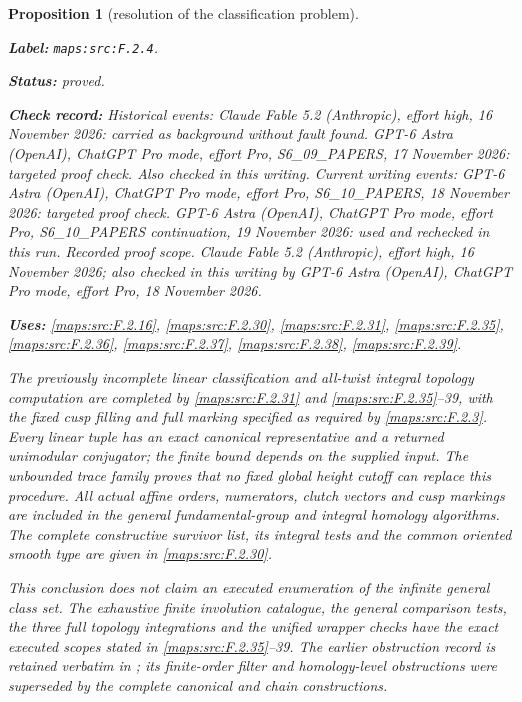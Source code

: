 \documentclass[11pt,a4paper]{article}
\newtheorem{proposition}[proposition]{Proposition}
\theoremstyle{definition}
\newcommand{\StatementRecord}[4]{\par\smallskip\begingroup\upshape\raggedright\noindent\textbf{Label:} \nolinkurl{#1}.\par\noindent\textbf{Status:} #2.\par\noindent\textbf{Check record:} #3.\par\noindent\textbf{Uses:} #4.\par\endgroup\smallskip}
\begin{document}
\begin{proposition}[resolution of the classification problem]\label{maps:src:F.2.4}
\StatementRecord{maps:src:F.2.4}{proved}{Historical events: Claude Fable 5.2 (Anthropic), effort high, 16 November 2026: carried as background without fault found. GPT-6 Astra (OpenAI), ChatGPT Pro mode, effort Pro, S6\_09\_PAPERS, 17 November 2026: targeted proof check. Also checked in this writing. Current writing events: GPT-6 Astra (OpenAI), ChatGPT Pro mode, effort Pro, S6\_10\_PAPERS, 18 November 2026: targeted proof check. GPT-6 Astra (OpenAI), ChatGPT Pro mode, effort Pro, S6\_10\_PAPERS continuation, 19 November 2026: used and rechecked in this run. \emph{Recorded proof scope.} Claude Fable 5.2 (Anthropic), effort high, 16 November 2026; also checked in this writing by GPT-6 Astra (OpenAI), ChatGPT Pro mode, effort Pro, 18 November 2026}{\cref{maps:src:F.2.16}, \cref{maps:src:F.2.30}, \cref{maps:src:F.2.31}, \cref{maps:src:F.2.35}, \cref{maps:src:F.2.36}, \cref{maps:src:F.2.37}, \cref{maps:src:F.2.38}, \cref{maps:src:F.2.39}}


The previously incomplete linear classification and all-twist
integral topology computation are completed by \ref{maps:src:F.2.31} and
\ref{maps:src:F.2.35}--39, with the fixed cusp filling and full marking
specified as required by \ref{maps:src:F.2.3}.  Every linear tuple has an
exact canonical representative and a returned unimodular
conjugator; the finite bound depends on the supplied input.
The unbounded trace family proves that no fixed global
height cutoff can replace this procedure.  All actual affine
orders, numerators, clutch vectors and cusp markings are
included in the general fundamental-group and integral
homology algorithms.  The complete constructive survivor
list, its integral tests and the common oriented smooth
type are given in \ref{maps:src:F.2.30}.

This conclusion does not claim an executed enumeration of
the infinite general class set.  The exhaustive finite
involution catalogue, the general comparison tests, the
three full topology integrations and the unified wrapper
checks have the exact executed scopes stated in \ref{maps:src:F.2.35}--39.
The earlier obstruction record is retained verbatim in
; its finite-order
filter and homology-level obstructions were superseded by
the complete canonical and chain constructions.


\end{proposition}
\end{document}
